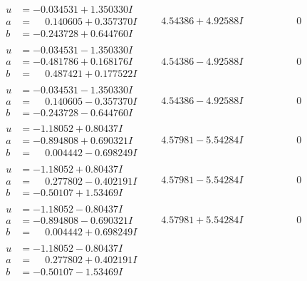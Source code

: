 \documentclass[1p]{elsarticle_modified}
\theoremstyle{definition}
\begin{document}
$$\begin{array}{c|c|c}
\begin{aligned}
u &= -0.034531 + 1.350330 I \\
a &= \phantom{-}0.140605 + 0.357370 I \\
b &= -0.243728 + 0.644760 I\end{aligned}
 & \phantom{-}4.54386 + 4.92588 I & \phantom{-0.000000 } 0 \\ \hline\begin{aligned}
u &= -0.034531 - 1.350330 I \\
a &= -0.481786 + 0.168176 I \\
b &= \phantom{-}0.487421 + 0.177522 I\end{aligned}
 & \phantom{-}4.54386 - 4.92588 I & \phantom{-0.000000 } 0 \\ \hline\begin{aligned}
u &= -0.034531 - 1.350330 I \\
a &= \phantom{-}0.140605 - 0.357370 I \\
b &= -0.243728 - 0.644760 I\end{aligned}
 & \phantom{-}4.54386 - 4.92588 I & \phantom{-0.000000 } 0 \\ \hline\begin{aligned}
u &= -1.18052 + 0.80437 I \\
a &= -0.894808 + 0.690321 I \\
b &= \phantom{-}0.004442 - 0.698249 I\end{aligned}
 & \phantom{-}4.57981 - 5.54284 I & \phantom{-0.000000 } 0 \\ \hline\begin{aligned}
u &= -1.18052 + 0.80437 I \\
a &= \phantom{-}0.277802 - 0.402191 I \\
b &= -0.50107 + 1.53469 I\end{aligned}
 & \phantom{-}4.57981 - 5.54284 I & \phantom{-0.000000 } 0 \\ \hline\begin{aligned}
u &= -1.18052 - 0.80437 I \\
a &= -0.894808 - 0.690321 I \\
b &= \phantom{-}0.004442 + 0.698249 I\end{aligned}
 & \phantom{-}4.57981 + 5.54284 I & \phantom{-0.000000 } 0 \\ \hline\begin{aligned}
u &= -1.18052 - 0.80437 I \\
a &= \phantom{-}0.277802 + 0.402191 I \\
b &= -0.50107 - 1.53469 I\end{aligned}

\end{array}$$
\end{document}
